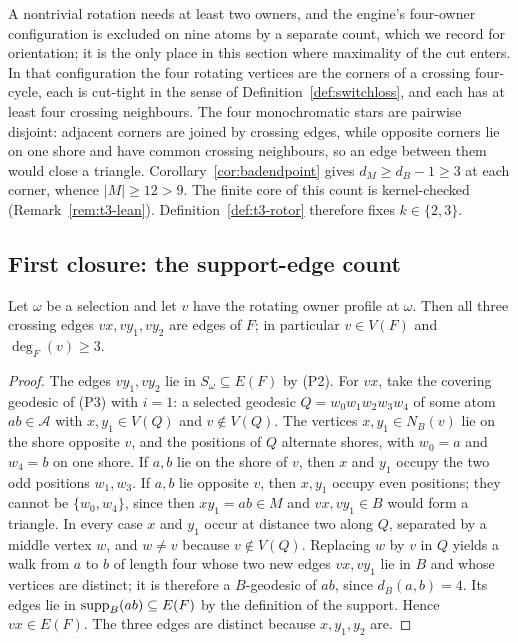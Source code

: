 \begin{remark}\label{rem:t3-fourowners}
A nontrivial rotation needs at least two owners, and the engine's
four-owner configuration is excluded on nine atoms by a separate count,
which we record for orientation; it is the only place in this section
where maximality of the cut enters. In that configuration the four
rotating vertices are the corners of a crossing four-cycle, each is
cut-tight in the sense of Definition~\ref{def:switchloss}, and each has
at least four crossing neighbours. The four monochromatic stars are
pairwise disjoint: adjacent corners are joined by crossing edges, while
opposite corners lie on one shore and have common crossing neighbours,
so an edge between them would close a triangle.
Corollary~\ref{cor:badendpoint} gives \(d_M\ge d_B-1\ge3\) at each
corner, whence \(|M|\ge12>9\). The finite core of this count is
kernel-checked (Remark~\ref{rem:t3-lean}).
Definition~\ref{def:t3-rotor} therefore fixes \(k\in\{2,3\}\).
\end{remark}

\subsection{First closure: the support-edge count}

\begin{lemma}\label{lem:t3-ownerdeg}
Let \(\omega\) be a selection and let \(v\) have the rotating owner
profile at \(\omega\). Then all three crossing edges
\(vx,vy_1,vy_2\) are edges of \(F\); in particular \(v\in V(F)\) and
\(\deg_F(v)\ge3\).
\end{lemma}

\begin{proof}
The edges \(vy_1,vy_2\) lie in \(S_\omega\subseteq E(F)\) by (P2). For
\(vx\), take the covering geodesic of (P3) with \(i=1\): a selected
geodesic \(Q=w_0w_1w_2w_3w_4\) of some atom \(ab\in\mathcal A\) with
\(x,y_1\in V(Q)\) and \(v\notin V(Q)\). The vertices \(x,y_1\in
N_B(v)\) lie on the shore opposite \(v\), and the positions of \(Q\)
alternate shores, with \(w_0=a\) and \(w_4=b\) on one shore. If \(a,b\)
lie on the shore of \(v\), then \(x\) and \(y_1\) occupy the two odd
positions \(w_1,w_3\). If \(a,b\) lie opposite \(v\), then \(x,y_1\)
occupy even positions; they cannot be \(\{w_0,w_4\}\), since then
\(xy_1=ab\in M\) and \(vx,vy_1\in B\) would form a triangle. In every
case \(x\) and \(y_1\) occur at distance two along \(Q\), separated by
a middle vertex \(w\), and \(w\ne v\) because \(v\notin V(Q)\).
Replacing \(w\) by \(v\) in \(Q\) yields a walk from \(a\) to \(b\) of
length four whose two new edges \(vx,vy_1\) lie in \(B\) and whose
vertices are distinct; it is therefore a \(B\)-geodesic of \(ab\),
since \(d_B(a,b)=4\). Its edges lie in
\(\operatorname{supp}_B(ab)\subseteq E(F)\) by the definition of the support. Hence
\(vx\in E(F)\). The three edges are distinct because \(x,y_1,y_2\)
are.
\end{proof}

